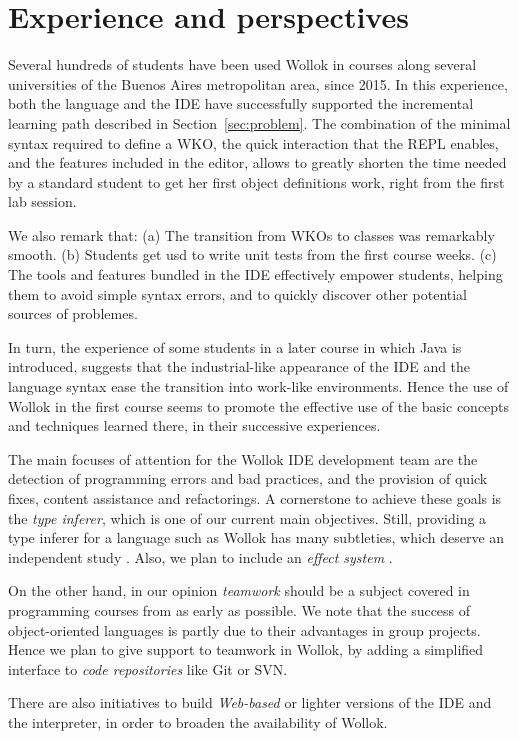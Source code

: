 \section{Experience and perspectives}
\label{sec:experience-perspectives}

Several hundreds of students have been used Wollok in courses along several universities of the Buenos Aires metropolitan area, since 2015.
In this experience, both the language and the IDE have successfully supported the incremental learning path described in Section~\ref{sec:problem}.
The combination of the minimal syntax required to define a WKO, the quick interaction that the REPL enables, and the features included in the editor, allows to greatly shorten the time needed by a standard student to get her first object definitions work, right from the first lab session.

We also remark that:
(a) The transition from WKOs to classes was remarkably smooth.
(b) Students get usd to write unit tests from the first course weeks.
(c) The tools and features bundled in the IDE effectively empower students, helping them to avoid simple syntax errors, and to quickly discover other potential sources of problemes.

In turn, the experience of some students in a later course in which Java is introduced, suggests that the industrial-like appearance of the IDE and the language syntax ease the transition into work-like environments. Hence the use of Wollok in the first course seems to promote the effective use of the basic concepts and techniques learned there, in their successive experiences.

\medskip
The main focuses of attention for the Wollok IDE development team are the detection of programming errors and bad practices, and the provision of quick fixes, content assistance and refactorings.
A cornerstone to achieve these goals is the \emph{type inferer}, which is one of our current main objectives.
Still, providing a type inferer for a language such as Wollok has many subtleties, which deserve an independent study \cite{passerini_nicolas_extensible_2014}.
Also, we plan to include an \emph{effect system} \cite{nielson_type_1999}.

On the other hand, in our opinion \emph{teamwork} should be a subject covered in programming courses from as early as possible. We note that the success of object-oriented languages is partly due to their advantages in group projects. 
Hence we plan to give support to teamwork in Wollok, by adding a simplified interface to \emph{code repositories} like Git or SVN.

There are also initiatives to build \emph{Web-based} or lighter versions of the IDE and the interpreter, in order to broaden the availability of Wollok.

























